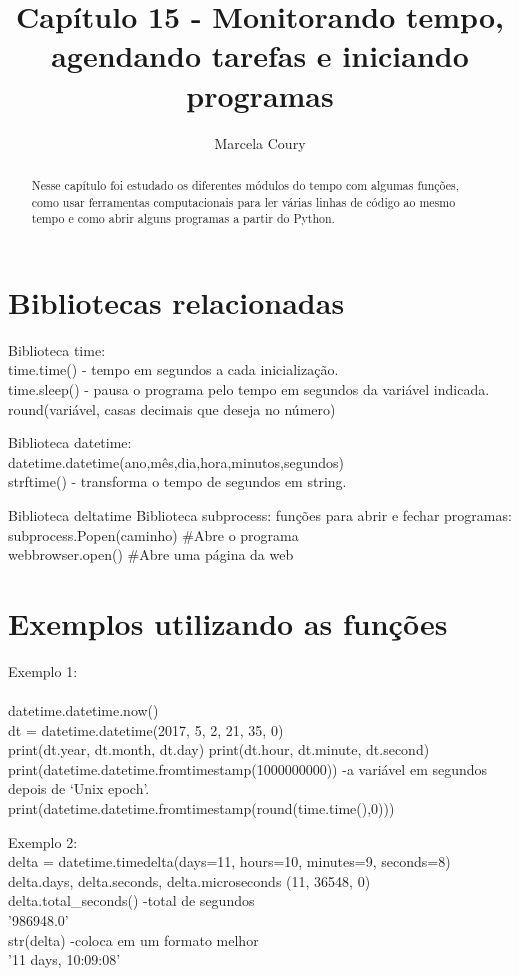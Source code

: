 \documentclass[12pt, a4paper]{article}
\title{Capítulo 15 - Monitorando tempo, agendando tarefas e iniciando programas}
\author{Marcela Coury}
\begin{document}
	\maketitle
\begin{abstract}
	Nesse capítulo foi estudado os diferentes módulos do tempo com algumas funções, como usar ferramentas computacionais para ler várias linhas de código ao mesmo tempo e como abrir alguns programas a partir do Python.
\end{abstract}
\section{Bibliotecas relacionadas}
	Biblioteca time:\\time.time() - tempo em segundos a cada inicialização.\\time.sleep() - pausa o programa pelo tempo em segundos da variável indicada.\\round(variável, casas decimais que deseja no número)
	
	Biblioteca datetime:\\datetime.datetime(ano,mês,dia,hora,minutos,segundos)\\strftime() - transforma o tempo de segundos em string.
	
	Biblioteca deltatime
	Biblioteca subprocess: funções para abrir e fechar programas:\\
	subprocess.Popen(caminho) \#Abre o programa\\
	 webbrowser.open() \#Abre uma página da web\\
	
\section{Exemplos utilizando as funções}
	Exemplo 1:\\\\datetime.datetime.now()\\dt = datetime.datetime(2017, 5, 2, 21, 35, 0)\\print(dt.year, dt.month, dt.day)
	print(dt.hour, dt.minute, dt.second)\\print(datetime.datetime.fromtimestamp(1000000000))  -a variável em segundos depois de ‘Unix epoch’.\\print(datetime.datetime.fromtimestamp(round(time.time(),0)))
	
	
	Exemplo 2:\\delta = datetime.timedelta(days=11, hours=10, minutes=9, seconds=8)\\delta.days, delta.seconds, delta.microseconds
	(11, 36548, 0)\\delta.total\_seconds()    -total de segundos\\'986948.0'\\str(delta)                -coloca em um formato melhor\\'11 days, 10:09:08'\\
	
\end{document}
